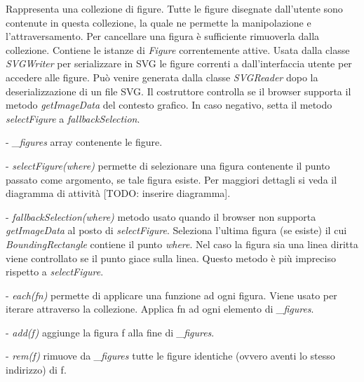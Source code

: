 Rappresenta una collezione di figure. Tutte le figure disegnate dall'utente sono contenute in questa collezione, la quale ne permette la manipolazione e l'attraversamento. Per cancellare una figura \`e sufficiente rimuoverla dalla collezione.
Contiene le istanze di \textit{Figure} correntemente attive.
Usata dalla classe \textit{SVGWriter} per serializzare in SVG le figure correnti a dall'interfaccia utente per accedere alle figure. Pu\`o venire generata dalla classe \textit{SVGReader} dopo la deserializzazione di un file SVG.
Il costruttore controlla se il browser supporta il metodo \textit{getImageData} del contesto grafico. In caso negativo, setta il metodo \textit{selectFigure} a \textit{fallbackSelection}.
\begin{elencopuntato}[\normindent]
\item[-] \textit{{\_}figures} array contenente le figure.
\end{elencopuntato}
\begin{elencopuntato}[\normindent]
\item[-]  \textit{selectFigure(where)} permette di selezionare una figura contenente il punto passato come argomento, se tale figura esiste. Per maggiori dettagli si veda il diagramma di attivit\`a [TODO: inserire diagramma].
\item[-] \textit{fallbackSelection(where)} metodo usato quando il browser non supporta \textit{getImageData} al posto di \textit{selectFigure}. Seleziona l'ultima figura (se esiste) il cui \textit{BoundingRectangle} contiene il punto \textit{where}. Nel caso la figura sia una linea diritta viene controllato se il punto giace sulla linea. Questo metodo \`e pi\`u impreciso rispetto a \textit{selectFigure}.
\item[-]  \textit{each(fn)} permette di applicare una funzione ad ogni figura. Viene usato per iterare attraverso la collezione. Applica fn ad ogni elemento di \textit{{\_}figures}. 
\item[-]  \textit{add(f)} aggiunge la figura f alla fine di \textit{{\_}figures}.
\item[-]  \textit{rem(f)} rimuove da \textit{{\_}figures} tutte le figure identiche (ovvero aventi lo stesso indirizzo) di f.
\end{elencopuntato}


